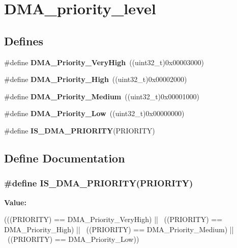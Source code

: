 \hypertarget{group__DMA__priority__level}{
\section{DMA\_\-priority\_\-level}
\label{group__DMA__priority__level}
}
\subsection*{Defines}
\begin{DoxyCompactItemize}
\item 
\hypertarget{group__DMA__priority__level_gadccd2f8b2ac24ba4fd485dd5b9b48671}{
\#define {\bfseries DMA\_\-Priority\_\-VeryHigh}~((uint32\_\-t)0x00003000)}
\label{group__DMA__priority__level_gadccd2f8b2ac24ba4fd485dd5b9b48671}

\item 
\hypertarget{group__DMA__priority__level_gae2441c0b4d4ba9945a6f4f7d08045a8e}{
\#define {\bfseries DMA\_\-Priority\_\-High}~((uint32\_\-t)0x00002000)}
\label{group__DMA__priority__level_gae2441c0b4d4ba9945a6f4f7d08045a8e}

\item 
\hypertarget{group__DMA__priority__level_ga8e0d4a958f4288c6c759945789490f38}{
\#define {\bfseries DMA\_\-Priority\_\-Medium}~((uint32\_\-t)0x00001000)}
\label{group__DMA__priority__level_ga8e0d4a958f4288c6c759945789490f38}

\item 
\hypertarget{group__DMA__priority__level_gaf414e0aa8dd42aee6f83f88ab6175179}{
\#define {\bfseries DMA\_\-Priority\_\-Low}~((uint32\_\-t)0x00000000)}
\label{group__DMA__priority__level_gaf414e0aa8dd42aee6f83f88ab6175179}

\item 
\#define {\bfseries IS\_\-DMA\_\-PRIORITY}(PRIORITY)
\end{DoxyCompactItemize}


\subsection{Define Documentation}
\hypertarget{group__DMA__priority__level_gaa1cae2ab458948511596467c87cd02b6}{
\subsubsection[{IS\_\-DMA\_\-PRIORITY}]{\setlength{\rightskip}{0pt plus 5cm}\#define IS\_\-DMA\_\-PRIORITY(PRIORITY)}}
\label{group__DMA__priority__level_gaa1cae2ab458948511596467c87cd02b6}
{\bfseries Value:}
\begin{DoxyCode}
(((PRIORITY) == DMA_Priority_VeryHigh) || \
                                   ((PRIORITY) == DMA_Priority_High) || \
                                   ((PRIORITY) == DMA_Priority_Medium) || \
                                   ((PRIORITY) == DMA_Priority_Low))
\end{DoxyCode}
